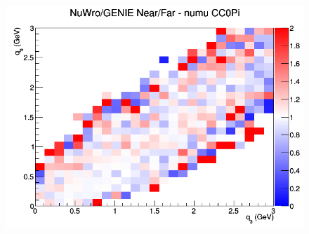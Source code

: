 \begin{figure}[h]
\endminipage
{}
\includegraphics[width=\linewidth]{eff_q0_q3/GAr/ratios/CC0Pi_NuWro_GENIE_numu_NF_q3_q0.png}
\endminipage
\newline
\end{figure}
\clearpage
